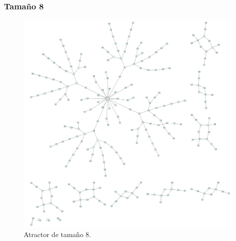 \documentclass[11pt]{article}
\begin{document}
			\subsubsection{Tamaño 8}
			\begin{figure}[H]
			\centering
			\includegraphics[scale=0.1]{resources/Atractores22/atractor_22_size_8.png}
			\caption{Atractor de tamaño 8.}\label{fig:picture}
			\end{figure}
\end{document}
